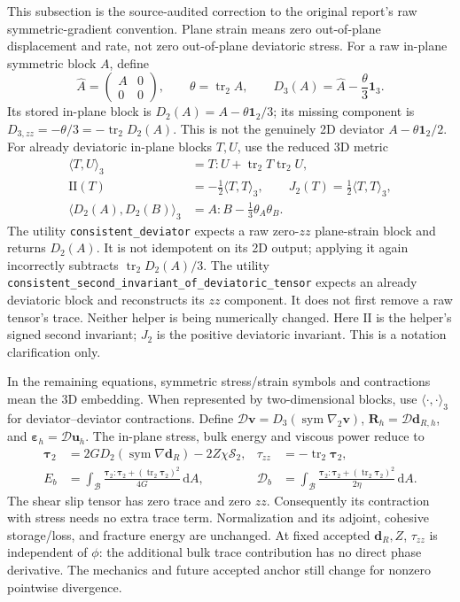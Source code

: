 \documentclass[11pt,a4paper]{article}
\newcommand{\B}{\mathcal B}
\newcommand{\Smat}{\bm{\mathcal S}}
\newcommand{\strain}{\bm\varepsilon}
\newcommand{\tauv}{\bm\tau}
\newcommand{\R}{\bm R}
\newcommand{\dd}{\,\mathrm d}
\newcommand{\sym}{\operatorname{sym}}
\newcommand{\Dcal}{\mathscr D}
\begin{document}
This subsection is the source-audited correction to the original report's raw
symmetric-gradient convention. Plane strain means zero out-of-plane displacement
and rate, not zero out-of-plane deviatoric stress. For a raw in-plane symmetric
block $A$, define
\[
 \widehat A=\begin{pmatrix}A&0\\0&0\end{pmatrix},\qquad
 \theta=\operatorname{tr}_2 A,\qquad
 D_3(A)=\widehat A-\frac\theta3\bm1_3.
\]
Its stored in-plane block is $D_2(A)=A-\theta\bm1_2/3$; its missing component is
$D_{3,zz}=-\theta/3=-\operatorname{tr}_2 D_2(A)$. This is not the genuinely
2D deviator $A-\theta\bm1_2/2$. For already deviatoric in-plane blocks $T,U$,
use the reduced 3D metric
\[
 \begin{aligned}
 \langle T,U\rangle_3&=T:U+\operatorname{tr}_2T\operatorname{tr}_2U,\\
 \mathrm{II}(T)&=-\tfrac12\langle T,T\rangle_3,
 \qquad J_2(T)=\tfrac12\langle T,T\rangle_3,\\
 \langle D_2(A),D_2(B)\rangle_3&=A:B-\tfrac13\theta_A\theta_B.
 \end{aligned}
\]
The utility \texttt{consistent\_deviator} expects a raw zero-$zz$ plane-strain
block and returns $D_2(A)$. It is not idempotent on its 2D output; applying it
again incorrectly subtracts $\operatorname{tr}_2D_2(A)/3$. The utility
\texttt{consistent\_second\_invariant\_of\_deviatoric\_tensor} expects an
already deviatoric block and reconstructs its $zz$ component. It does not first
remove a raw tensor's trace. Neither helper is being numerically changed.
Here $\mathrm{II}$ is the helper's signed second invariant; $J_2$ is the
positive deviatoric invariant. This is a notation clarification only.

In the remaining equations, symmetric stress/strain symbols and contractions
mean the 3D embedding. When represented by two-dimensional blocks, use
$\langle\cdot,\cdot\rangle_3$ for deviator--deviator contractions. Define
$\mathcal D\bm v=D_3(\sym\nabla_2\bm v)$, $\R_h=\mathcal D\bm d_{R,h}$,
and $\strain_h=\mathcal D\bm u_h$. The in-plane stress, bulk energy and
viscous power reduce to
\begin{align}
 \tauv_2&=2G D_2(\sym\nabla\bm d_R)-2Z\chi\Smat_2,
 &\tau_{zz}&=-\operatorname{tr}_2\tauv_2,\\
 E_b&=\int_\B\frac{\tauv_2:\tauv_2+
                    (\operatorname{tr}_2\tauv_2)^2}{4G}\dd A,
 &\Dcal_b&=\int_\B\frac{\tauv_2:\tauv_2+
                    (\operatorname{tr}_2\tauv_2)^2}{2\eta}\dd A.
\end{align}
The shear slip tensor has zero trace and zero $zz$. Consequently its contraction
with stress needs no extra trace term. Normalization and its adjoint, cohesive
storage/loss, and fracture energy are unchanged. At fixed accepted $\bm d_R,Z$,
$\tau_{zz}$ is independent of $\phi$: the additional bulk trace contribution
has no direct phase derivative. The mechanics and future accepted anchor still
change for nonzero pointwise divergence.
\end{document}
